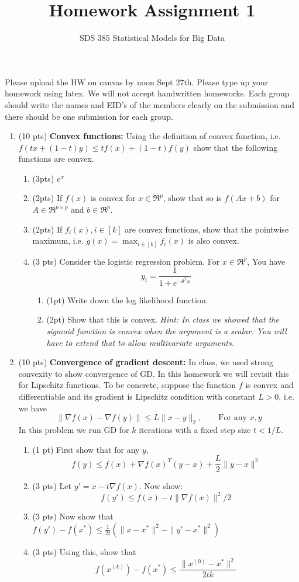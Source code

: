 \documentclass[11pt]{article}
\newcommand{\bi}{\begin{enumerate}}
\newcommand{\ib}{\end{enumerate}}
\newcommand{\p}{\item}
\begin{document}
\title{{\bf Homework Assignment 1}}
\author{SDS 385 Statistical Models for Big Data}

\date{}

\maketitle{}
Please upload the HW on canvas by noon Sept 27th. Please type up your homework using latex. We will not accept handwritten homeworks. Each group should write the names and EID's of the members clearly on the submission and there should be one submission for each group. 
\begin{enumerate}%
\item (10 pts) \textbf{Convex functions: } Using the definition of convex function, i.e. $f(tx+(1-t)y)\leq tf(x)+(1-t)f(y)$ show that the following functions are convex.
\bi
\p (3pts) $e^x$
\p (2pts) If $f(x)$ is convex for $x\in\Re^p$, show that so is $f(Ax+b)$ for $A\in \Re^{p\times p}$ and $b\in \Re^p$.
\p (2pts) If $f_i(x),i\in[k]$ are convex functions, show that the pointwise maximum, i.e. $g(x)=\max_{i\in[k]}f_i(x)$ is also convex.
\p (3 pts) Consider the logistic regression problem. For $x\in \Re^p$, You have
$$y_i=\frac{1}{1+e^{-\theta^T x}}$$

\bi
\p (1pt) Write down the log likelihood function.
\p (2pt) Show that this is convex.
\textit{Hint: In class we showed that the sigmoid function is convex when the argument is a scalar. You will have to extend that to allow multivariate arguments.}
\ib

\ib
\item (10 pts) \textbf{Convergence of gradient descent:} In class, we used strong convexity to show convergence of GD. In this homework we will revisit this for Lipschitz functions. To be concrete, suppose the function $f$ is convex and differentiable and its gradient is Lipschitz condition with constant $L>0$, i.e. we have 
$$\|\nabla f(x)-\nabla f(y)\|\leq L\|x-y\|_2, \qquad \mbox{For any $x,y$}$$
In this problem we run GD for $k$ iterations with a fixed step size $t<1/L$.
\begin{enumerate} 
	\item (1 pt) First show that for any $y$,
	$$f(y)\leq f(x)+\nabla f(x)^T(y-x)+\frac{L}{2}\|y-x\|^2$$
	\item (3 pts) Let $y'=x-t\nabla f(x)$. Now show:
	$$f(y')\leq f(x)-t\|\nabla f(x)\|^2/2$$
	\item (3 pts) Now show that $f(y')-f(x^*)\leq \frac{1}{2t}(\|x-x^*\|^2-\|y'-x^*\|^2)$
	\item (3 pts) Using this, show that $$f(x^{(k)})-f(x^*)\leq \frac{\|x^{(0)}-x^*\|^2}{2tk}$$
\end{enumerate}


\end{enumerate}
\end{document}
